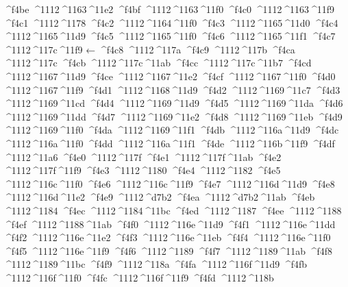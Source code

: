 \checkit ^^^^f4be ^^^^1112^^^^1163^^^^11e2
\checkit ^^^^f4bf ^^^^1112^^^^1163^^^^11f0
\checkit ^^^^f4c0 ^^^^1112^^^^1163^^^^11f9
\checkit ^^^^f4c1 ^^^^1112^^^^1178
\checkit ^^^^f4c2 ^^^^1112^^^^1164^^^^11f0
\checkit ^^^^f4c3 ^^^^1112^^^^1165^^^^11d0
\checkit ^^^^f4c4 ^^^^1112^^^^1165^^^^11d9
\checkit ^^^^f4c5 ^^^^1112^^^^1165^^^^11f0
\checkit ^^^^f4c6 ^^^^1112^^^^1165^^^^11f1
\checkit ^^^^f4c7 ^^^^1112^^^^117c^^^^11f9 ←
\checkit ^^^^f4c8 ^^^^1112^^^^117a
\checkit ^^^^f4c9 ^^^^1112^^^^117b
\checkit ^^^^f4ca ^^^^1112^^^^117c
\checkit ^^^^f4cb ^^^^1112^^^^117c^^^^11ab
\checkit ^^^^f4cc ^^^^1112^^^^117c^^^^11b7
\checkit ^^^^f4cd ^^^^1112^^^^1167^^^^11d9
\checkit ^^^^f4ce ^^^^1112^^^^1167^^^^11e2
\checkit ^^^^f4cf ^^^^1112^^^^1167^^^^11f0
\checkit ^^^^f4d0 ^^^^1112^^^^1167^^^^11f9
\checkit ^^^^f4d1 ^^^^1112^^^^1168^^^^11d9
\checkit ^^^^f4d2 ^^^^1112^^^^1169^^^^11c7
\checkit ^^^^f4d3 ^^^^1112^^^^1169^^^^11cd
\checkit ^^^^f4d4 ^^^^1112^^^^1169^^^^11d9
\checkit ^^^^f4d5 ^^^^1112^^^^1169^^^^11da
\checkit ^^^^f4d6 ^^^^1112^^^^1169^^^^11dd
\checkit ^^^^f4d7 ^^^^1112^^^^1169^^^^11e2
\checkit ^^^^f4d8 ^^^^1112^^^^1169^^^^11eb
\checkit ^^^^f4d9 ^^^^1112^^^^1169^^^^11f0
\checkit ^^^^f4da ^^^^1112^^^^1169^^^^11f1
\checkit ^^^^f4db ^^^^1112^^^^116a^^^^11d9
\checkit ^^^^f4dc ^^^^1112^^^^116a^^^^11f0
\checkit ^^^^f4dd ^^^^1112^^^^116a^^^^11f1
\checkit ^^^^f4de ^^^^1112^^^^116b^^^^11f9
\checkit ^^^^f4df ^^^^1112^^^^11a6
\checkit ^^^^f4e0 ^^^^1112^^^^117f
\checkit ^^^^f4e1 ^^^^1112^^^^117f^^^^11ab
\checkit ^^^^f4e2 ^^^^1112^^^^117f^^^^11f9
\checkit ^^^^f4e3 ^^^^1112^^^^1180
\checkit ^^^^f4e4 ^^^^1112^^^^1182
\checkit ^^^^f4e5 ^^^^1112^^^^116c^^^^11f0
\checkit ^^^^f4e6 ^^^^1112^^^^116c^^^^11f9
\checkit ^^^^f4e7 ^^^^1112^^^^116d^^^^11d9
\checkit ^^^^f4e8 ^^^^1112^^^^116d^^^^11e2
\checkit ^^^^f4e9 ^^^^1112^^^^d7b2
\checkit ^^^^f4ea ^^^^1112^^^^d7b2^^^^11ab
\checkit ^^^^f4eb ^^^^1112^^^^1184
\checkit ^^^^f4ec ^^^^1112^^^^1184^^^^11bc
\checkit ^^^^f4ed ^^^^1112^^^^1187
\checkit ^^^^f4ee ^^^^1112^^^^1188
\checkit ^^^^f4ef ^^^^1112^^^^1188^^^^11ab
\checkit ^^^^f4f0 ^^^^1112^^^^116e^^^^11d9
\checkit ^^^^f4f1 ^^^^1112^^^^116e^^^^11dd
\checkit ^^^^f4f2 ^^^^1112^^^^116e^^^^11e2
\checkit ^^^^f4f3 ^^^^1112^^^^116e^^^^11eb
\checkit ^^^^f4f4 ^^^^1112^^^^116e^^^^11f0
\checkit ^^^^f4f5 ^^^^1112^^^^116e^^^^11f9
\checkit ^^^^f4f6 ^^^^1112^^^^1189
\checkit ^^^^f4f7 ^^^^1112^^^^1189^^^^11ab
\checkit ^^^^f4f8 ^^^^1112^^^^1189^^^^11bc
\checkit ^^^^f4f9 ^^^^1112^^^^118a
\checkit ^^^^f4fa ^^^^1112^^^^116f^^^^11d9
\checkit ^^^^f4fb ^^^^1112^^^^116f^^^^11f0
\checkit ^^^^f4fc ^^^^1112^^^^116f^^^^11f9
\checkit ^^^^f4fd ^^^^1112^^^^118b
